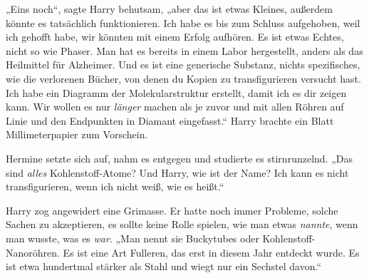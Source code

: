 „Eins noch“, sagte Harry behutsam, „aber das ist etwas Kleines, außerdem könnte es tatsächlich funktionieren. Ich habe es bis zum Schluss aufgehoben, weil ich gehofft habe, wir könnten mit einem Erfolg aufhören. Es ist etwas Echtes, nicht so wie Phaser. Man hat es bereits in einem Labor hergestellt, anders als das Heilmittel für Alzheimer. Und es ist eine generische Substanz, nichts spezifisches, wie die verlorenen Bücher, von denen du Kopien zu transfigurieren versucht hast. Ich habe ein Diagramm der Molekularstruktur erstellt, damit ich es dir zeigen kann. Wir wollen es nur \emph{länger} machen als je zuvor und mit allen Röhren auf Linie und den Endpunkten in Diamant eingefasst.“ Harry brachte ein Blatt Millimeterpapier zum Vorschein.

Hermine setzte sich auf, nahm es entgegen und studierte es stirnrunzelnd.
„Das sind \emph{alles} Kohlenstoff-Atome? Und Harry, wie ist der Name? Ich kann es nicht transfigurieren, wenn ich nicht weiß, wie es heißt.“

Harry zog angewidert eine Grimasse. Er hatte noch immer Probleme, solche Sachen zu akzeptieren, es sollte keine Rolle spielen, wie man etwas \emph{nannte}, wenn man wusste, was es \emph{war}.
„Man nennt sie Buckytubes oder Kohlenstoff-Nanoröhren. Es ist eine Art Fulleren, das erst in diesem Jahr entdeckt wurde. Es ist etwa hundertmal stärker als Stahl und wiegt nur ein Sechstel davon.“

